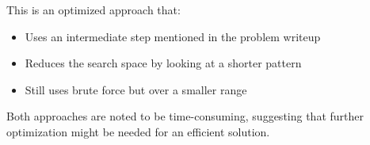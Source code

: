 \documentclass{article}
\begin{document}
This is an optimized approach that:
\begin{itemize}
    \item Uses an intermediate step mentioned in the problem writeup
    \item Reduces the search space by looking at a shorter pattern
    \item Still uses brute force but over a smaller range
\end{itemize}

Both approaches are noted to be time-consuming, suggesting that further optimization might be needed for an efficient solution.
\end{document}
